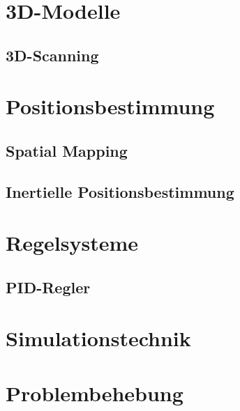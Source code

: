 \section{3D-Modelle}

    \subsection{3D-Scanning}

\section{Positionsbestimmung}

    \subsection{Spatial Mapping}

    \subsection{Inertielle Positionsbestimmung}

\section{Regelsysteme}

    \subsection{PID-Regler}

\section{Simulationstechnik}

\section{Problembehebung}
